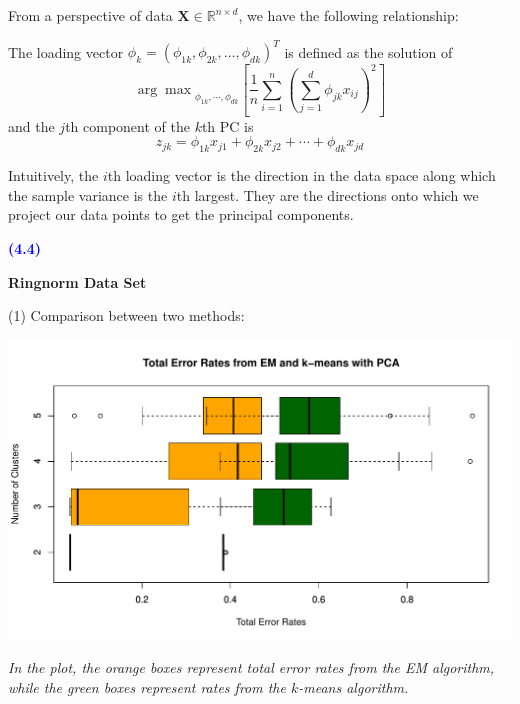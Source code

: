 \documentclass[a4paper,12pt]{article}
\newcommand{\qnum}[1]{\noindent\textcolor{blue}{\textbf{(#1)}}}
\begin{document}
From a perspective of data $\textbf{X}\in \mathbb{R}^{n\times d}$, we have the following relationship:

The loading vector $\phi_k = (\phi_{1k}, \phi_{2k},\dots, \phi_{dk})^T$ is defined as the solution of 
\[
    {\arg\max}_{\phi_{1k},\cdots,\phi_{dk}}\left[
        \frac{1}{n}\sum_{i=1}^n
        \left(\sum_{j=1}^d
            \phi_{jk}x_{ij}
        \right)^2
    \right]
\]
and the $j$th component of the $k$th PC is
\[
    z_{jk} = \phi_{1k}x_{j1} + \phi_{2k}x_{j2} + \cdots + \phi_{dk}x_{jd}
\]

Intuitively, the $i$th loading vector is the direction in the data space along which the sample variance is the $i$th largest. They are the directions onto which we project our data points to get the principal components.
\bigskip\bigskip



\qnum{4.4}
\begin{center}
    \textcolor{mydarkgreen}{\textbf{Ringnorm Data Set}}
\end{center}
\bigskip

\noindent (1) Comparison between two methods:

\begin{center}
  \includegraphics[width=0.9\linewidth]{Image/Prob4-4-TotalErr-Ringnorm-Both.pdf}
  
   \parbox{0.9\textwidth}{\textit{In the plot, the \textcolor{myorange}{orange boxes} represent total error rates from the EM algorithm, while the \textcolor{mydarkgreen}{green boxes} represent rates from the $k$-means algorithm.
  }}
\end{center}
\bigskip
\end{document}
